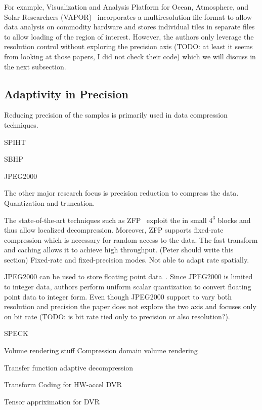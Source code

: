 For example, Visualization and Analysis Platform for Ocean, Atmosphere, and Solar Researchers
(VAPOR)~\cite{multires_toolkit2003, vapor2007} incorporates a multiresolution file
format to allow data analysis on commodity hardware and stores individual tiles in
separate files to allow loading of the region of interest.
However, the authors only leverage the resolution control without exploring the precision axis
(TODO: at least it seems from looking at those papers, I did not check their code) which
we will discuss in the next subsection.


\subsection{Adaptivity in Precision}
Reducing precision of the samples is primarily used in data compression techniques. 

SPIHT~\cite{spiht1996}


SBHP~\cite{sbhp2000}

JPEG2000~\cite{jpeg2001}


The other major research focus is precision reduction to compress the data. Quantization and
truncation.



The state-of-the-art techniques such as ZFP~\cite{zfp2014} exploit the in small $4^3$ blocks
and thus allow localized decompression. Moreover, ZFP supports fixed-rate compression which
is necessary for random access to the data. The fast transform and caching allows it to
achieve high throughput. (Peter should write this section)
Fixed-rate and fixed-precision modes. Not able to adapt rate spatially.

JPEG2000 can be used to store floating point data~\cite{woodring2011}. Since JPEG2000 is limited
to integer data, authors perform uniform scalar quantization to convert floating point data to integer
form. Even though JPEG2000 support to vary both resolution and precision the paper does not explore
the two axis and focuses only on bit rate (TODO: is bit rate tied only to precision or also resolution?).


SPECK~\cite{speck2004}



Volume rendering stuff
Compression domain volume rendering~\cite{compression_domain2003}

Transfer function adaptive decompression~\cite{tf_decompression2004}

Transform Coding for HW-accel DVR~\cite{hw_dvr2007}

Tensor appriximation for DVR~\cite{tensor_dvr2015}



